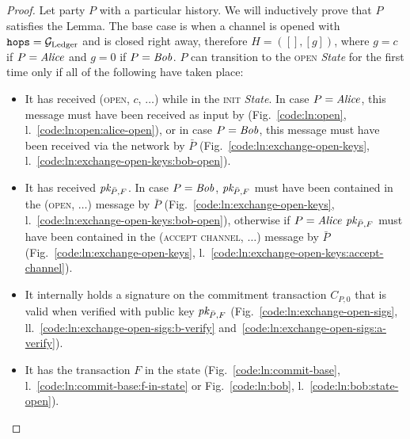 \begin{proof}
  Let party $P$ with a particular history. We will inductively prove that $P$
  satisfies the Lemma. The base case is when a channel is opened with
  $\texttt{hops} = \mathcal{G}_{\mathrm{Ledger}}$ and is closed right away, therefore $H = ([], [g])$,
  where $g = c$ if $P = \mathit{Alice}$ and $g = 0$ if $P = \mathit{Bob}$.  $P$ can transition
  to the \textsc{open} \textit{State} for the first time only if all of the
  following have taken place:
  \begin{itemize}
    \item It has received (\textsc{open}, $c$, $\dots$) while in the
    \textsc{init} \textit{State}. In case $P = \mathit{Alice}$, this message must have
    been received as input by \environment (Fig.~\ref{code:ln:open},
    l.~\ref{code:ln:open:alice-open}), or in case $P = \mathit{Bob}$, this message must
    have been received via the network by $\bar{P}$
    (Fig.~\ref{code:ln:exchange-open-keys},
    l.~\ref{code:ln:exchange-open-keys:bob-open}).
    \item It has received $\textit{pk}_{\bar{P}, F}$. In case $P = \mathit{Bob}$, $\textit{pk}_{\bar{P},
    F}$ must have been contained in the (\textsc{open}, $\dots$) message by
    $\bar{P}$ (Fig.~\ref{code:ln:exchange-open-keys},
    l.~\ref{code:ln:exchange-open-keys:bob-open}), otherwise if $P = \mathit{Alice}$
    $\textit{pk}_{\bar{P}, F}$ must have been contained in the (\textsc{accept channel},
    $\dots$) message by $\bar{P}$ (Fig.~\ref{code:ln:exchange-open-keys},
    l.~\ref{code:ln:exchange-open-keys:accept-channel}).
    \item It internally holds a signature on the commitment transaction $C_{P,
    0}$ that is valid when verified with public key $\textit{pk}_{\bar{P}, F}$
    (Fig.~\ref{code:ln:exchange-open-sigs},
    ll.~\ref{code:ln:exchange-open-sigs:b-verify}
    and~\ref{code:ln:exchange-open-sigs:a-verify}).
    \item It has the transaction $F$ in the \ledger state
    (Fig.~\ref{code:ln:commit-base}, l.~\ref{code:ln:commit-base:f-in-state} or
    Fig.~\ref{code:ln:bob}, l.~\ref{code:ln:bob:state-open}).
  \end{itemize}


\end{proof}

